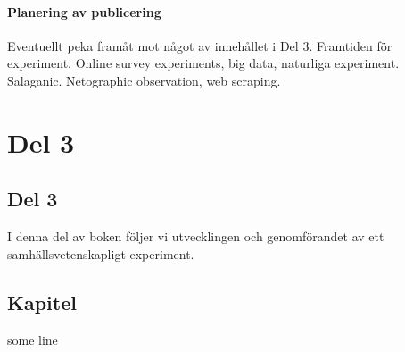 \documentclass[
]{book}
\begin{document}
\hypertarget{sub08.3.4}{%
\subsection{Planering av publicering}\label{sub08.3.4}}

Eventuellt peka framåt mot något av innehållet i Del 3. Framtiden för experiment. Online survey experiments, big data, naturliga experiment. Salaganic. Netographic observation, web scraping.

\newpage

\hypertarget{part-del-3}{%
\part{Del 3}\label{part-del-3}}

\hypertarget{del-3}{%
\chapter*{Del 3}\label{del-3}}

I denna del av boken följer vi utvecklingen och genomförandet av ett samhällsvetenskapligt experiment.

\hypertarget{chap09}{%
\chapter{Kapitel}\label{chap09}}

some line

  
\end{document}
